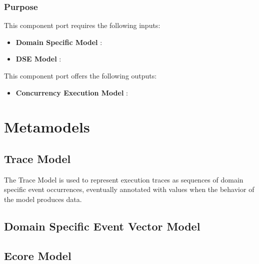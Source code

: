 \documentclass{gemoc} %
\begin{document}
\subsubsection{Purpose}

This component port requires the following inputs:
\begin{itemize}
  \item \textbf{Domain Specific Model} :
  \item \textbf{DSE Model} :
\end{itemize}

This component port offers the following outputs:
\begin{itemize}
  \item \textbf{Concurrency Execution Model} :
\end{itemize}

\section{Metamodels}
\subsection{Trace Model}
The Trace Model is used to represent execution traces as sequences of domain specific event occurrences, eventually annotated with values when the behavior of the model produces data.

\subsection{Domain Specific Event Vector Model}


\subsection{Ecore Model}
\end{document}
